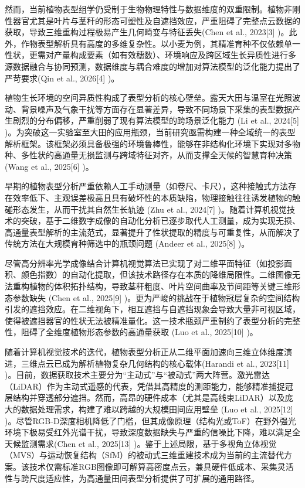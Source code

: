 \documentclass[preprint,12pt]{elsarticle}
\begin{document}
然而，当前植物表型组学仍受制于生物物理特性与数据维度的双重限制。植物非刚性器官尤其是叶片与茎秆的形态可塑性及自遮挡效应，严重阻碍了完整点云数据的获取，导致三维重构过程极易产生几何畸变与特征丢失(Chen et al., 2023[3] )。此外，作物表型解析具有高度的多维复杂性。以小麦为例，其精准育种不仅依赖单一性状，更需对产量构成要素（如有效穗数）、环境响应及跨区域生长异质性进行多源数据融合与协同预测，数据维度与耦合难度的增加对算法模型的泛化能力提出了严苛要求(Qin et al., 2026[4] )。

植物生长环境的空间异质性构成了表型分析的核心壁垒。露天大田与温室在光照波动、背景噪声及气象干扰等方面存在显著差异，导致不同场景下采集的表型数据产生剧烈的分布偏移，严重削弱了现有算法模型的跨场景泛化能力 (Li et al., 2024[5] )。为突破这一实验室至大田的应用瓶颈，当前研究亟需构建一种全域统一的表型解析框架。该框架必须具备极强的环境鲁棒性，能够在非结构化环境下实现对多物种、多性状的高通量无损监测与跨域特征对齐，从而支撑全天候的智慧育种决策 (Wang et al., 2025[6] )。

早期的植物表型分析严重依赖人工手动测量（如卷尺、卡尺），这种接触式方法存在效率低下、主观误差极高且具有破坏性的本质缺陷，物理接触往往诱发植物的触碰形态发生，从而干扰其自然生长轨迹 (Zhu et al., 2024[7] )。随着计算机视觉技术的突破，基于二维数字成像的自动化分析已逐步取代人工测量，成为实现无损、高通量表型解析的主流范式，显著提升了性状提取的精度与可重复性，从而解决了传统方法在大规模育种筛选中的瓶颈问题 (Andeer et al., 2025[8] )。

尽管高分辨率光学成像结合计算机视觉算法已实现了对二维平面特征（如投影面积、颜色指数）的自动化提取，但该技术路径存在本质的降维局限性。二维图像无法重构植物的体积拓扑结构，导致茎秆粗度、叶片空间曲率及节间距等关键三维形态参数缺失 (Chen et al., 2025[9] )。更为严峻的挑战在于植物冠层复杂的空间结构引发的遮挡效应。在二维视角下，相互遮挡与自遮挡现象会导致大量非可视区域，使得被遮挡器官的性状无法被精准量化。这一技术瓶颈严重制约了表型分析的完整性，阻碍了全维度植物形态参数的高通量获取 (Luo et al., 2025[10] )。

随着计算机视觉技术的迭代，植物表型分析正从二维平面加速向三维立体维度演进，三维点云已成为解析植物复杂几何结构的核心载体(Harandi et al., 2023[11] )。目前，数据获取技术主要分为“主动式”与“被动式”两大阵营。激光雷达（LiDAR）作为主动式遥感的代表，凭借其高精度的测距能力，能够精准捕捉冠层结构并穿透部分遮挡。然而，高昂的硬件成本（尤其是高线束LiDAR）以及庞大的数据处理需求，构建了难以跨越的大规模田间应用壁垒 (Luo et al., 2025[12] )。尽管RGB-D深度相机降低了门槛，但其成像原理（结构光或ToF）在野外强光环境下极易受红外光谱干扰，导致深度数据缺失与严重的信噪比下降，难以满足全天候监测需求(Chen et al., 2025[13] )。鉴于上述局限，基于多视角立体视觉（MVS）与运动恢复结构（SfM）的被动式三维重建技术成为当前的主流替代方案。该技术仅需标准RGB图像即可解算高密度点云，兼具硬件低成本、采集灵活性与跨尺度适应性，为高通量田间表型分析提供了可扩展的通用路径。
\end{document}
